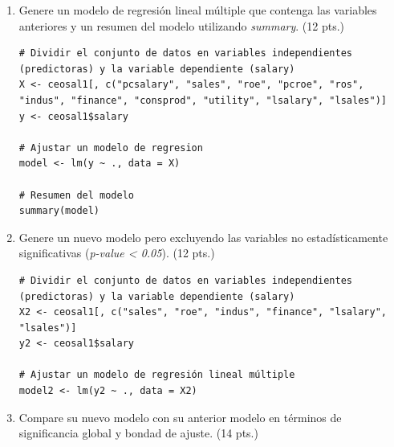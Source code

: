 \documentclass[letterpaper,11pt]{article}
\begin{document}
\begin{enumerate}
\begin{lstlisting}
columnas_deseadas <- c("pcsalary", "sales", "roe", "pcroe", "ros", "indus", "finance", "consprod", "utility", "lsalary", "lsales")
ceosal1 <- ceosal1[columnas_deseadas]
\end{lstlisting}

    \item Genere un modelo de regresión lineal múltiple que contenga las variables anteriores y un resumen del modelo utilizando \textit{summary}. (12 pts.)
\begin{lstlisting}
# Dividir el conjunto de datos en variables independientes (predictoras) y la variable dependiente (salary)
X <- ceosal1[, c("pcsalary", "sales", "roe", "pcroe", "ros", "indus", "finance", "consprod", "utility", "lsalary", "lsales")]
y <- ceosal1$salary

# Ajustar un modelo de regresion
model <- lm(y ~ ., data = X)

# Resumen del modelo
summary(model)
\end{lstlisting}

    \item Genere un nuevo modelo pero excluyendo las variables no estadísticamente significativas (\textit{p-value < 0.05}). (12 pts.)
\begin{lstlisting}
# Dividir el conjunto de datos en variables independientes (predictoras) y la variable dependiente (salary)
X2 <- ceosal1[, c("sales", "roe", "indus", "finance", "lsalary", "lsales")]
y2 <- ceosal1$salary

# Ajustar un modelo de regresión lineal múltiple
model2 <- lm(y2 ~ ., data = X2)
\end{lstlisting}

    \item Compare su nuevo modelo con su anterior modelo en términos de significancia global y bondad de ajuste. (14 pts.)

\end{enumerate}
\newpage
\end{document}
